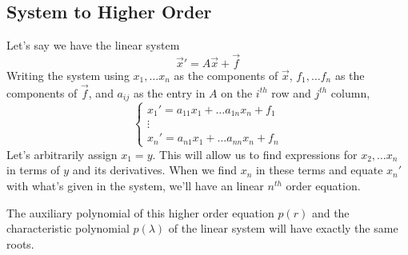 \subsection{System to Higher Order}
Let's say we have the linear system
\begin{equation*}
	\vec{x}' = A\vec{x} + \vec{f}
\end{equation*}
Writing the system using $x_1, \ldots x_n$ as the components of $\vec{x}$, $f_1, \ldots f_n$ as the components of $\vec{f}$, and $a_{ij}$ as the entry in $A$ on the $i^{th}$ row and $j^{th}$ column,
\begin{equation*}
	\begin{cases}
		x_1' = a_{11}x_1 + \ldots a_{1n}x_n + f_1 \\
		\vdots \\
		x_n' = a_{n1}x_1 + \ldots a_{nn}x_n + f_n
	\end{cases}
\end{equation*}
Let's arbitrarily assign $x_1 = y$. This will allow us to find expressions for $x_2, \ldots x_n$ in terms of $y$ and its derivatives. When we find $x_n$ in these terms and equate $x_n'$ with what's given in the system, we'll have an linear $n^{th}$ order equation.

\ifodd{}\fi

\noindent
The auxiliary polynomial of this higher order equation $p(r)$ and the characteristic polynomial $p(\lambda)$ of the linear system will have exactly the same roots.